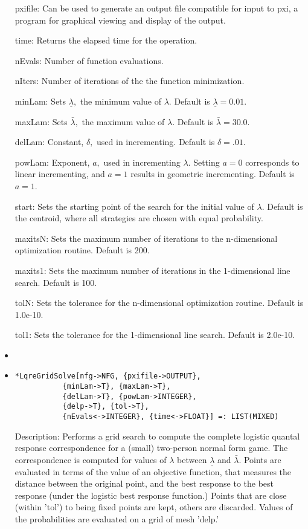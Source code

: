 \begin{itemize}
\bd
\item
[pxifile:] Can be used to generate an output file compatible for input
to pxi, a program for graphical viewing and display of the output.  
\item
[time:] Returns the elapsed time for the operation.
\item
[nEvals:] Number of function evaluations.
\item
[nIters:] Number of iterations of the the function minimization.
\item
[minLam:] Sets $\underline\lambda,$ the minimum value of $\lambda.$
Default is $\underline\lambda = 0.01$.
\item
[maxLam:] Sets $\bar\lambda,$ the maximum value of $\lambda.$  Default is
$\bar\lambda = 30.0.$
\item
[delLam:]  Constant, $\delta,$ used in incrementing.   Default is
$\delta = .01.$
\item
[powLam:] Exponent, $a,$ used in incrementing $\lambda.$  Setting $a = 0$
corresponds to linear incrementing, and $a = 1$ results in geometric
incrementing.  Default is $a = 1$.
\item
[start:] Sets the starting point of the search for the initial value of
$\lambda.$  Default is the centroid, where all strategies are chosen
with equal probability.  
\item
[maxitsN:] Sets the maximum number of iterations to the
n-dimensional optimization routine.  Default is 200.
\item
[maxits1:] Sets the maximum number of iterations in the
1-dimensional line search.  Default is 100.
\item
[tolN:] Sets the tolerance for the n-dimensional optimization
routine.  Default is 1.0e-10.
\item
[tol1:] Sets the tolerance for the 1-dimensional line search.
Default is 2.0e-10.
\item
\ed
\ed

\item
\protect \large \begin{verbatim}
*LqreGridSolve[nfg->NFG, {pxifile->OUTPUT},
           {minLam->T}, {maxLam->T}, 
           {delLam->T}, {powLam->INTEGER}, 
           {delp->T}, {tol->T},
           {nEvals<->INTEGER}, {time<->FLOAT}] =: LIST(MIXED)
\end{verbatim}\normalsize

\bd
\item
[Description:] Performs a grid search to compute the complete logistic
quantal response correspondence for a (small) two-person normal form
game.  The correspondence is computed for values of $\lambda$ between
$\underline{\lambda}$ and $\bar{\lambda}.$ Points are evaluated in
terms of the value of an objective function, that measures the
distance between the original point, and the best response to the best
response (under the logistic best response function.)  Points that are
close (within 'tol') to being fixed points are kept, others are
discarded.  Values of the probabilities are evaluated on a grid of
mesh 'delp.'


\end{itemize}
